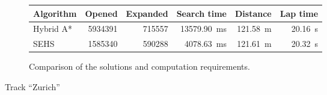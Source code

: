\begin{figure}[!tbp]
	\vspace{0.75cm}
	
	\begin{subfigure}[t]{\textwidth}
		\centering
		\begin{tabular}{l r r r r r}%
			\toprule
			Algorithm & Opened & Expanded & Search time & Distance & Lap time \\
			\midrule
			Hybrid A* & \num{5934391} & \num{715557} & \SI{13579.90}{\milli\second} & \SI{121.58}{\meter} & \SI{20.16}{\second} \\
			SEHS & \num{1585340} & \num{590288} & \SI{4078.63}{\milli\second} & \SI{121.61}{\meter} & \SI{20.32}{\second} \\
			\bottomrule
		\end{tabular}
		\caption{Comparison of the solutions and computation requirements.}
		\label{table:zurich}
	\end{subfigure}
	
	\vspace{0.75cm}

	\caption{Track ``Zurich''}
\end{figure}